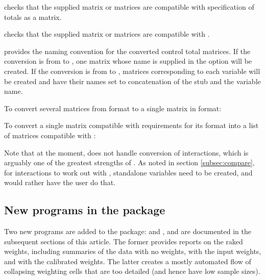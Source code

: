 \hangpara
{} checks that the supplied matrix or matrices are compatible with  
specification of totals as a matrix.

\hangpara
{} checks that the supplied matrix or matrices are compatible with .

\hangpara
{} provides the naming convention for the converted control total matrices.
If the conversion is from  to , one matrix whose name is supplied in 
the  option will be created. If the conversion is from  to 
, matrices corresponding to each variable will be created and have their names
set to concatenation of the stub and the variable name.

To convert several matrices from  format to a single matrix 
in  format:

\begin{stlog}
\nullskip
\end{stlog}

To convert a single matrix compatible with  requirements for its 
 format into a list of matrices compatible with
:

\begin{stlog}
\nullskip
\end{stlog}

Note that at the moment,  does not handle conversion
of interactions, which is arguably one of the greatest strengths of .
As noted in section \ref{subsec:compare}, for interactions to work out with ,
standalone variables need to be created, and  would rather
have the user do that.

\subsection{New programs in the package}

Two new programs are added to the package:  and ,
and are documented in the subsequent sections of this article. The former provides reports on the raked weights,
including summaries of the data with no weights, with the input weights, and with the calibrated weights.
The latter creates a mostly automated flow of collapsing weighting cells that are too detailed
(and hence have low sample sizes).

